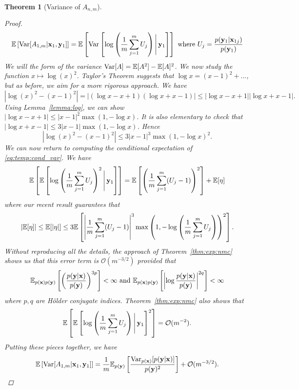 \documentclass[a4paper, 10pt]{report}
\theoremstyle{plain}
\newtheorem{theorem}{Theorem}[chapter]
\begin{document}
\begin{theorem}[Variance of $A_{n,m}$]
\begin{proof}
\begin{equation}
			\mathbb{E}\left[\mathrm{Var}[A_{1,m}|{\mathbf{x}}_1,{\mathbf{y}}_1]\right] = \mathbb{E}\left[\mathrm{Var}\left[ \log\left( \frac{1}{m} \sum_{j=1}^m U_j \right) \Bigg{|}\, {\mathbf{y}}_1 \right]\right] \text{  where  } U_j = \frac{p({\mathbf{y}}_1|{\mathbf{x}}_{1j})}{p({\mathbf{y}}_1)}
			\end{equation}
			We will the form of the variance $\mathrm{Var}[A] = \mathbb{E}[A^2] - \mathbb{E}[A]^2$.
			We now study the function $x \mapsto \log(x)^2$. Taylor's Theorem suggests that $\log x  = (x-1)^2 + ...$, but as before, we aim for a more rigorous approach. We have
			\begin{equation}
			|\log(x)^2 - (x-1)^2|=|(\log x - x + 1)(\log x + x -1)|\le |\log x - x + 1||\log x + x -1|.
			\end{equation}
			Using Lemma~\ref{lemma:log}, we can show $|\log x - x + 1|\le |x-1|^2\max(1,-\log x)$. 
			It is also elementary to check that $|\log x + x -1|\le 3|x-1|\max(1,-\log x)$. Hence
			\begin{equation}
			|\log(x)^2 - (x-1)^2|\le 3|x-1|^3 \max(1,-\log x)^2.
			\end{equation}
			We can now return to computing the conditional expectation of \eqref{eq:temp:cond_var}. We have
			\begin{align}
			\mathbb{E}\left[\mathbb{E}\left[ \log\left( \frac{1}{m} \sum_{j=1}^m U_j \right)^2 \Bigg{|}\, {\mathbf{y}}_1 \right]\right] = \mathbb{E}\left[ \left( \frac{1}{m} \sum_{j=1}^m (U_j-1) \right)^2   \right] + \mathbb{E}[\eta]
			\end{align}
			where our recent result guarantees that
			\begin{equation}
			\left|\mathbb{E}[\eta]\right| \le \mathbb{E}[|\eta|] \le 3\mathbb{E}\left[ \left| \frac{1}{m}\sum_{j=1}^m (U_j -1) \right|^3 \max\left(1, -\log\left( \frac{1}{m} \sum_{j=1}^m U_j \right) \right)^2  \right].
			\end{equation}
			Without reproducing all the details, the approach of Theorem~\ref{thm:exp:nmc} shows us that this error term is $\mathcal{O}(m^{-3/2})$ provided that
			\begin{equation}
			\mathbb{E}_{p({\mathbf{x}})p({\mathbf{y}})}\left[\left(\frac{p({\mathbf{y}}|{\mathbf{x}})}{p({\mathbf{y}})}\right)^{3p} \right]<\infty \text{  and  } \mathbb{E}_{p({\mathbf{x}})p({\mathbf{y}})}\left[\left|  \log \frac{p({\mathbf{y}}|{\mathbf{x}})}{p({\mathbf{y}})} \right|^{2q}\right]<\infty
			\end{equation}
			where $p,q$ are H\"{o}lder conjugate indices.
			Theorem~\ref{thm:exp:nmc} also shows that 
			\begin{equation}
			\mathbb{E}\left[\mathbb{E}\left[ \log\left( \frac{1}{m} \sum_{j=1}^m U_j \right) \Bigg{|}\, {\mathbf{y}}_1 \right]^2\right] = \mathcal{O}(m^{-2}).
			\end{equation}
			Putting these pieces together, we have
			\begin{equation}
			\mathbb{E}\left[\mathrm{Var}[A_{1,m}|{\mathbf{x}}_1,{\mathbf{y}}_1]\right] = \frac{1}{m}\mathbb{E}_{p({\mathbf{y}})}\left[\frac{\mathrm{Var}_{p({\mathbf{x}})}[p({\mathbf{y}}|{\mathbf{x}})]}{p({\mathbf{y}})^2} \right] + \mathcal{O}(m^{-3/2}).
			\end{equation}
			

\end{proof}
\end{theorem}
\end{document}

